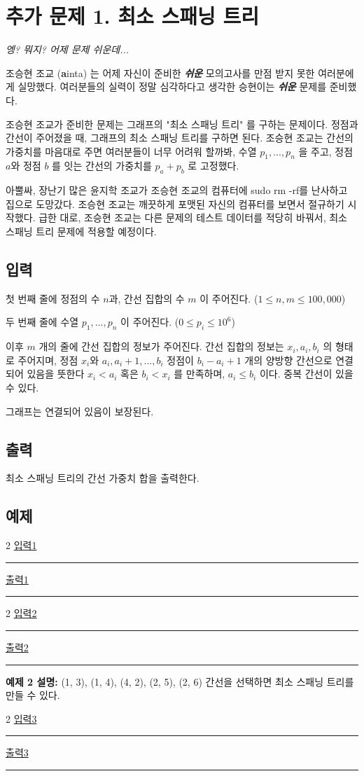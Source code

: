 \documentclass{article}
\def\inputdataname{입력}
\def\outputdataname{출력}
\newcommand{\iodataNo}[1]{%
	\begin{minipage}{\textwidth}
		\begin{multicols}{2}
			\href{run:input#1.txt}{\inputdataname#1} \\
			\rule{\columnwidth}{1pt}
			
			\columnbreak
			\href{run:output#1.txt}{\outputdataname#1} \\
			\rule{\columnwidth}{1pt}
			
		\end{multicols}
		\vspace{\baselineskip}
	\end{minipage}
}
\begin{document}
	
\section{추가 문제 1. 최소 스패닝 트리}

\begin{center}
	\textit{엥? 뭐지? 어제 문제 쉬운데...}
\end{center}
조승현 조교 (\textbf{a}inta) 는 어제 자신이 준비한 \textbf{\textit{쉬운}} 모의고사를 만점 받지 못한 여러분에게 실망했다. 여러분들의 실력이 정말 심각하다고 생각한 승현이는 \textbf{\textit{쉬운}} 문제를 준비했다. \newline

조승현 조교가 준비한 문제는 그래프의 "최소 스패닝 트리" 를 구하는 문제이다. 정점과 간선이 주어졌을 때, 그래프의 최소 스패닝 트리를 구하면 된다. 조승현 조교는 간선의 가중치를 마음대로 주면 여러분들이 너무 어려워 할까봐, 수열 $p_1, ..., p_n$ 을 주고, 정점  $a$와 정점 $b$ 를 잇는 간선의 가중치를 $p_a + p_b$ 로 고정했다. \newline

아뿔싸, 장난기 많은 윤지학 조교가 조승현 조교의 컴퓨터에 sudo rm -rf를 난사하고 집으로 도망갔다. 조승현 조교는 깨끗하게 포맷된 자신의 컴퓨터를 보면서 절규하기 시작했다. 급한 대로, 조승현 조교는 다른 문제의 테스트 데이터를 적당히 바꿔서, 최소 스패닝 트리 문제에 적용할 예정이다.

\subsection{입력}
첫 번째 줄에 정점의 수 $n$과, 간선 집합의 수 $m$ 이 주어진다. ($1 \leq n, m \leq 100,000$) \newline

두 번째 줄에 수열 $p_1, ..., p_n$ 이 주어진다. ($0 \leq p_i \leq 10^6$) \newline

이후 $m$ 개의 줄에 간선 집합의 정보가 주어진다. 간선 집합의 정보는 $x_i, a_i, b_i$ 의 형태로 주어지며, 정점 $x_i$와 $a_i, a_i + 1, ..., b_i$ 정점이 $b_i - a_i + 1$ 개의 양방향 간선으로 연결되어 있음을 뜻한다 $x_i < a_i$ 혹은 $b_i < x_i$ 를 만족하며, $a_i \leq b_i$ 이다. 중복 간선이 있을 수 있다. \newline

그래프는 연결되어 있음이 보장된다.

\subsection{출력}
최소 스패닝 트리의 간선 가중치 합을 출력한다.

\subsection{예제}

\iodataNo{1}
\iodataNo{2}

\textbf{예제 2 설명:} (1, 3), (1, 4), (4, 2), (2, 5), (2, 6) 간선을 선택하면 최소 스패닝 트리를 만들 수 있다. \newline

\iodataNo{3}

\newpage
\end{document}
